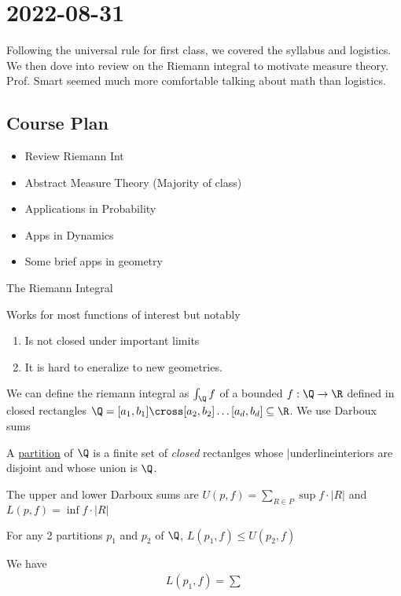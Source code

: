 \section{2022-08-31}

Following the universal rule for first class, we covered the syllabus and logistics. We then dove into review on the Riemann integral to motivate measure theory. Prof. Smart seemed much more comfortable talking about math than logistics.

\subsection{Course Plan}
\begin{itemize}
		\item Review Riemann Int
		\item Abstract Measure Theory (Majority of class)
		\item Applications in Probability
		\item Apps in Dynamics
		\item Some brief apps in geometry
\end{itemize}

\begin{problem} The Riemann Integral 
\item Works for most functions of interest but notably
		\begin{enumerate}
				\item Is not closed under important limits
				\item It is hard to eneralize to new geometries.
		\end{enumerate}
\end{problem}

\begin{definition}
		We can define the riemann integral as $\int_{{\Q}}^{{}} {f}$ of a bounded $f : \Q \to \R$ 
		defined in closed rectangles
		$\Q = [a_1,b_1] \cross [a_2,b_2] \ldots [a_d,b_d] \subseteq \R$. We use Darboux sums
\end{definition}

\vline
\begin{definition}[partition]
		A \underline{partition} of $\Q$	is a finite set of \emph{closed} rectanlges whose |underline{interiors} are disjoint and whose union is $\Q$.
\end{definition}

\vline

The upper and lower Darboux sums are $U(p,f) =\sum_{R \in P}^{} \sup f \cdot |R|$ and \newline 
$L(p,f) = \inf f \cdot |R|$

\begin{lemma}
		For any 2 partitions $p_1$ and $p_2$ of  $\Q$,  $L(p_1,f) \leq U(p_2, f)$
\end{lemma}

\begin{solution}
		We have
		\begin{align*}
				L(p_1, f) = \sum_{}^{}
		\end{align*} 
\end{solution}



